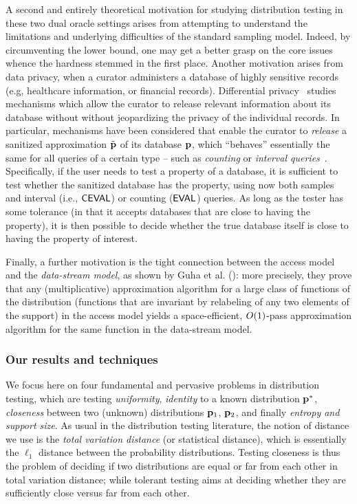   A second and entirely theoretical motivation for studying distribution testing in these two dual oracle settings arises from attempting to understand the limitations and underlying difficulties of the standard sampling model. Indeed, by circumventing the lower bound, one may get a better grasp on the core issues whence the hardness stemmed in the first place.  
  Another motivation arises from data privacy, when a curator administers a database of highly sensitive records (e.g, healthcare information, or financial records). 
  Differential privacy~\cite{DN:03,DN:04,Dwork:08} studies mechanisms which allow the curator to release relevant information about its database without without jeopardizing the privacy of the individual records.
  In particular, mechanisms have been considered that enable the curator to \emph{release} a sanitized approximation $\tilde{\mathbf{p}}$ of its database $\mathbf{p}$, which ``behaves'' essentially the same for all queries of a certain type -- such as \emph{counting} or \emph{interval queries}~\cite{BLR:13}.\footnotemark{}
   Specifically, if the user needs to test a property of a database, it is sufficient to test whether the sanitized database has the property, using now both samples and interval (i.e., ${\sf CEVAL}$) or counting (${\sf EVAL}$) queries. As long as the tester has some tolerance (in that it accepts databases that are close to having the property), it is then possible to decide whether the true database itself is close to having the property of interest.   
     
  Finally, a further motivation is the tight connection between the \pdfsamp access model and the \emph{data-stream model}, as shown by Guha et al. (\cite[Theorem 25]{GMV:06}): more precisely, they prove that any (multiplicative) approximation algorithm for a large class of functions of the distribution (functions that are invariant by relabeling of any two elements of the support) in the \pdfsamp access model yields a space-efficient, $\bigO{1}$-pass approximation algorithm for the same function in the data-stream model.

      \subsubsection{Our results and techniques}
  We focus here on four fundamental and pervasive problems in distribution testing, which are testing \emph{uniformity}, \emph{identity} to a known distribution $\mathbf{p}^\ast$, \emph{closeness} between two (unknown) distributions $\mathbf{p}_1$, $\mathbf{p}_2$, and finally \emph{entropy and support size}. As usual in the distribution testing literature, the notion of distance we use is the \emph{total variation distance} (or statistical distance), which is essentially the $\ell_1$ distance between the probability distributions. Testing closeness is thus the problem of deciding if two distributions are equal or far from each other in total variation distance; while tolerant testing aims at deciding whether they are sufficiently close versus far from each other.
    
